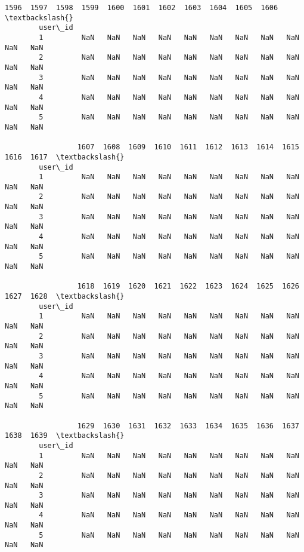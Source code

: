 \documentclass[11pt]{article}
\begin{document}
\begin{Verbatim}[commandchars=\\\{\}]
                 1596  1597  1598  1599  1600  1601  1602  1603  1604  1605  1606  \textbackslash{}
        user\_id                                                                     
        1         NaN   NaN   NaN   NaN   NaN   NaN   NaN   NaN   NaN   NaN   NaN   
        2         NaN   NaN   NaN   NaN   NaN   NaN   NaN   NaN   NaN   NaN   NaN   
        3         NaN   NaN   NaN   NaN   NaN   NaN   NaN   NaN   NaN   NaN   NaN   
        4         NaN   NaN   NaN   NaN   NaN   NaN   NaN   NaN   NaN   NaN   NaN   
        5         NaN   NaN   NaN   NaN   NaN   NaN   NaN   NaN   NaN   NaN   NaN   
        
                 1607  1608  1609  1610  1611  1612  1613  1614  1615  1616  1617  \textbackslash{}
        user\_id                                                                     
        1         NaN   NaN   NaN   NaN   NaN   NaN   NaN   NaN   NaN   NaN   NaN   
        2         NaN   NaN   NaN   NaN   NaN   NaN   NaN   NaN   NaN   NaN   NaN   
        3         NaN   NaN   NaN   NaN   NaN   NaN   NaN   NaN   NaN   NaN   NaN   
        4         NaN   NaN   NaN   NaN   NaN   NaN   NaN   NaN   NaN   NaN   NaN   
        5         NaN   NaN   NaN   NaN   NaN   NaN   NaN   NaN   NaN   NaN   NaN   
        
                 1618  1619  1620  1621  1622  1623  1624  1625  1626  1627  1628  \textbackslash{}
        user\_id                                                                     
        1         NaN   NaN   NaN   NaN   NaN   NaN   NaN   NaN   NaN   NaN   NaN   
        2         NaN   NaN   NaN   NaN   NaN   NaN   NaN   NaN   NaN   NaN   NaN   
        3         NaN   NaN   NaN   NaN   NaN   NaN   NaN   NaN   NaN   NaN   NaN   
        4         NaN   NaN   NaN   NaN   NaN   NaN   NaN   NaN   NaN   NaN   NaN   
        5         NaN   NaN   NaN   NaN   NaN   NaN   NaN   NaN   NaN   NaN   NaN   
        
                 1629  1630  1631  1632  1633  1634  1635  1636  1637  1638  1639  \textbackslash{}
        user\_id                                                                     
        1         NaN   NaN   NaN   NaN   NaN   NaN   NaN   NaN   NaN   NaN   NaN   
        2         NaN   NaN   NaN   NaN   NaN   NaN   NaN   NaN   NaN   NaN   NaN   
        3         NaN   NaN   NaN   NaN   NaN   NaN   NaN   NaN   NaN   NaN   NaN   
        4         NaN   NaN   NaN   NaN   NaN   NaN   NaN   NaN   NaN   NaN   NaN   
        5         NaN   NaN   NaN   NaN   NaN   NaN   NaN   NaN   NaN   NaN   NaN   
        

\end{Verbatim}
\end{document}
